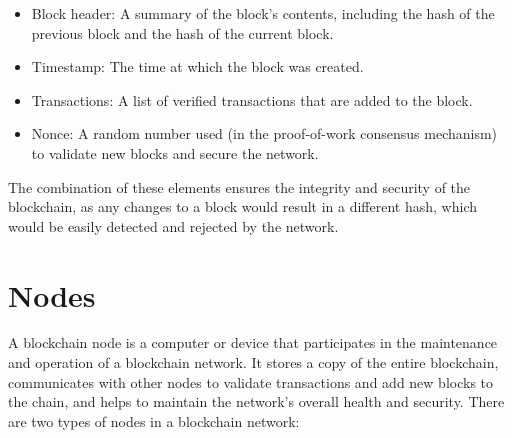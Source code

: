 \documentclass[target=mst,aauheader=]{thud}
\begin{document}
        \begin{itemize}

            \item Block header: A summary of the block's contents, including the hash of the previous block and the hash of the current block.
            \item Timestamp: The time at which the block was created.
            \item Transactions: A list of verified transactions that are added to the block.
            \item Nonce: A random number used (in the proof-of-work consensus mechanism) to validate new blocks and secure the network.
    
        \end{itemize}

    The combination of these elements ensures the integrity and security of the blockchain, as any changes to a block would result in a different hash, which would be easily detected and rejected by the network.

    \section{Nodes}
    
    A blockchain node is a computer or device that participates in the maintenance and operation of a blockchain network. It stores a copy of the entire blockchain, communicates with other nodes to validate transactions and add new blocks to the chain, and helps to maintain the network's overall health and security. There are two types of nodes in a blockchain network:
\end{document}
